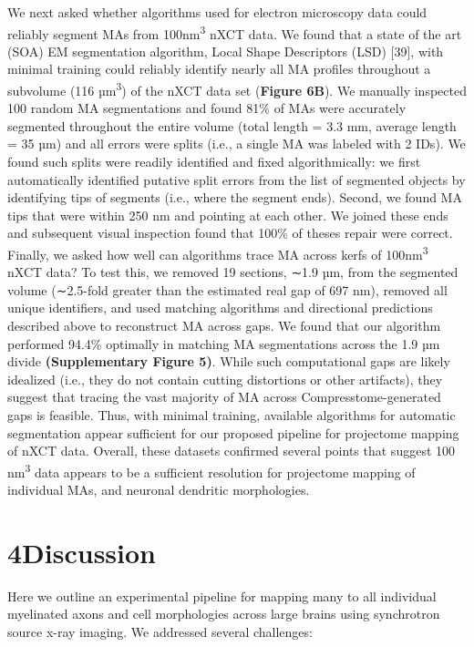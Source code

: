 \documentclass{article}
\begin{document}
We next asked whether algorithms used for electron microscopy data could reliably segment MAs from 100nm\textsuperscript{3} nXCT data. We found that a state of the art (SOA) EM segmentation algorithm, Local Shape Descriptors (LSD) [39], with minimal training could reliably identify nearly all MA profiles throughout a subvolume (116 µm\textsuperscript{3}) of the nXCT data set (\textbf{Figure 6B}). We manually inspected 100 random MA segmentations and found 81\% of MAs were accurately segmented throughout the entire volume (total length = 3.3 mm, average length = 35 µm) and all errors were splits (i.e., a single MA was labeled with 2 IDs). We found such splits were readily identified and fixed algorithmically: we first automatically identified putative split errors from the list of segmented objects by identifying tips of segments (i.e., where the segment ends). Second, we found MA tips that were within 250 nm and pointing at each other. We joined these ends and subsequent visual inspection found that 100\% of theses repair were correct. Finally, we asked how well can algorithms trace MA across kerfs of 100nm\textsuperscript{3} nXCT data? To test this, we removed 19 sections, ∼1.9 µm, from the segmented volume (∼2.5-fold greater than the estimated real gap of 697 nm), removed all unique identifiers, and used matching algorithms and directional predictions described above to reconstruct MA across gaps. We found that our algorithm performed 94.4\% optimally in matching MA segmentations across the 1.9 µm divide \textbf{(Supplementary Figure 5)}. While such computational gaps are likely idealized (i.e., they do not contain cutting distortions or other artifacts), they suggest that tracing the vast majority of MA across Compresstome-generated gaps is feasible. Thus, with minimal training, available algorithms for automatic segmentation appear sufficient for our proposed pipeline for projectome mapping of nXCT data. Overall, these datasets confirmed several points that suggest 100 nm\textsuperscript{3} data appears to be a sufficient resolution for projectome mapping of individual MAs, and neuronal dendritic morphologies.

\section*{4\quad Discussion}

Here we outline an experimental pipeline for mapping many to all individual myelinated axons and cell morphologies across large brains using synchrotron source x-ray imaging. We addressed several challenges:
\end{document}
